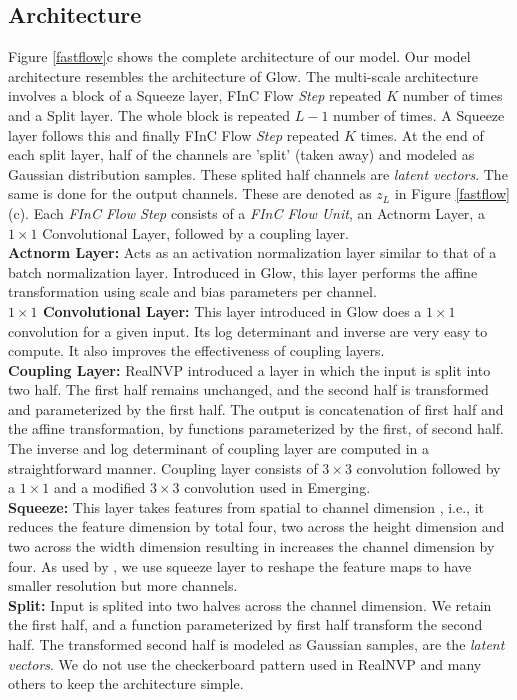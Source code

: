 \documentclass[a4paper,twoside]{article}
\theoremstyle{definition}
\begin{document}
\subsection{Architecture}\label{subsec:arch}
Figure \ref{fastflow}c shows the complete architecture of our model. Our model architecture resembles the architecture of Glow. The multi-scale architecture involves a block of a Squeeze layer, FInC Flow \emph{Step} repeated $K$ number of times and a Split layer. The whole block is repeated $L - 1$ number of times. A Squeeze layer follows this and finally FInC Flow \emph{Step} repeated $K$ times.
At the end of each split layer, half of the channels are 'split' (taken away) and modeled as Gaussian distribution samples. These splited half channels are \emph{latent vectors}. The same is done for the output channels. These are denoted as $z_L$ in Figure \ref{fastflow}(c). 
Each \emph{FInC Flow Step} consists of a \emph{FInC Flow Unit}, an Actnorm Layer, a $1 \times 1$ Convolutional Layer, followed by a coupling layer. \\
\textbf{Actnorm Layer:} Acts as an activation normalization layer similar to that of a batch normalization layer. Introduced in Glow, this layer performs the affine transformation using scale and bias parameters per channel. 
\\
\textbf{$1 \times 1$ Convolutional Layer:} This layer introduced in Glow does a $1 \times 1$ convolution for a given input. Its log determinant and inverse are very easy to compute. It also improves the effectiveness of coupling layers.
\\
\textbf{Coupling Layer:} RealNVP introduced a layer in which the input is split into two  half. The first half remains unchanged, and the second half is transformed and parameterized by the first half. The output is concatenation of first half and the affine transformation, by functions parameterized by the first, of second half. The inverse and log determinant of coupling layer are computed in a straightforward manner. Coupling layer consists of $3 \times 3$ convolution followed by a $1 \times 1$ and a modified $3 \times 3$ convolution used in Emerging.
\\
\textbf{Squeeze:} This layer takes features from spatial to channel dimension \citep{behrmann2019invertible}, i.e., it reduces the feature dimension by total four, two across the height dimension and two across the width dimension resulting in increases the channel dimension by four. As used by \citep{dinh2016density}, we use squeeze layer to reshape the feature maps to have smaller resolution but more channels.
\\
\textbf{Split:} Input is splited into two halves across the channel dimension. We retain the first half, and a function parameterized by first half transform the second half. The transformed second half is modeled as Gaussian samples, are the \emph{latent vectors}. We do not use the checkerboard pattern used in RealNVP \citep{dinh2016density} and many others to keep the architecture simple.
\end{document}
